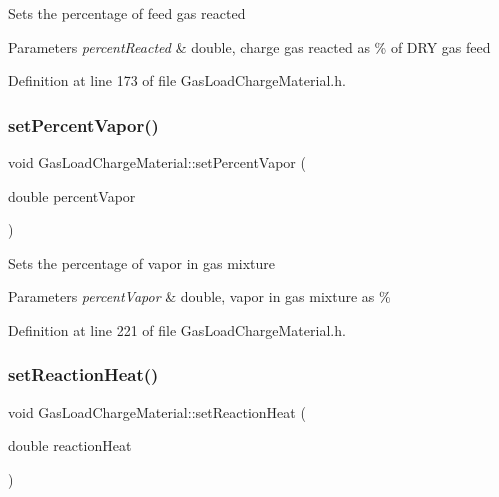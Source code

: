 Sets the percentage of feed gas reacted 
\begin{DoxyParams}{Parameters}
{\em percent\+Reacted} & double, charge gas reacted as \% of D\+RY gas feed \\
\hline
\end{DoxyParams}


Definition at line 173 of file Gas\+Load\+Charge\+Material.\+h.

\mbox{\label{class_gas_load_charge_material_acace81e16ef531acb0a68462ab0ed25d}} 
\subsubsection{\texorpdfstring{set\+Percent\+Vapor()}{setPercentVapor()}}
{\footnotesize\ttfamily void Gas\+Load\+Charge\+Material\+::set\+Percent\+Vapor (\begin{DoxyParamCaption}\item[{double}]{percent\+Vapor }\end{DoxyParamCaption})\hspace{0.3cm}{\ttfamily [inline]}}

Sets the percentage of vapor in gas mixture 
\begin{DoxyParams}{Parameters}
{\em percent\+Vapor} & double, vapor in gas mixture as \% \\
\hline
\end{DoxyParams}


Definition at line 221 of file Gas\+Load\+Charge\+Material.\+h.

\mbox{\label{class_gas_load_charge_material_a721f02cbd0bfbb6ebe67c0da09f0b0f2}} 
\subsubsection{\texorpdfstring{set\+Reaction\+Heat()}{setReactionHeat()}}
{\footnotesize\ttfamily void Gas\+Load\+Charge\+Material\+::set\+Reaction\+Heat (\begin{DoxyParamCaption}\item[{double}]{reaction\+Heat }\end{DoxyParamCaption})\hspace{0.3cm}{\ttfamily [inline]}}

